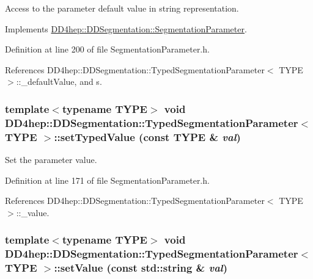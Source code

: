 Access to the parameter default value in string representation. 

Implements \hyperlink{class_d_d4hep_1_1_d_d_segmentation_1_1_segmentation_parameter_a2ef4dee84f8c9172aca49908c8fff136}{DD4hep::DDSegmentation::SegmentationParameter}.

Definition at line 200 of file SegmentationParameter.h.

References DD4hep::DDSegmentation::TypedSegmentationParameter$<$ TYPE $>$::\_\-defaultValue, and s.\hypertarget{class_d_d4hep_1_1_d_d_segmentation_1_1_typed_segmentation_parameter_a53509da19e4377e01d2fdb685f94778a}{
\subsubsection[{setTypedValue}]{\setlength{\rightskip}{0pt plus 5cm}template$<$typename TYPE$>$ void {\bf DD4hep::DDSegmentation::TypedSegmentationParameter}$<$ TYPE $>$::setTypedValue (const TYPE \& {\em val})}}
\label{class_d_d4hep_1_1_d_d_segmentation_1_1_typed_segmentation_parameter_a53509da19e4377e01d2fdb685f94778a}


Set the parameter value. 

Definition at line 171 of file SegmentationParameter.h.

References DD4hep::DDSegmentation::TypedSegmentationParameter$<$ TYPE $>$::\_\-value.\hypertarget{class_d_d4hep_1_1_d_d_segmentation_1_1_typed_segmentation_parameter_a32e4b30c056572c1892b0607d05774e2}{
\subsubsection[{setValue}]{\setlength{\rightskip}{0pt plus 5cm}template$<$typename TYPE$>$ void {\bf DD4hep::DDSegmentation::TypedSegmentationParameter}$<$ TYPE $>$::setValue (const std::string \& {\em val})}}
\label{class_d_d4hep_1_1_d_d_segmentation_1_1_typed_segmentation_parameter_a32e4b30c056572c1892b0607d05774e2}


